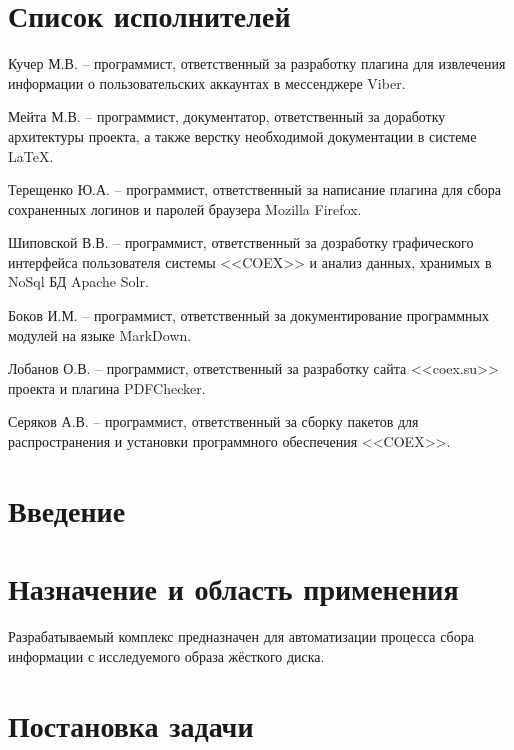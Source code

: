 


 
 
 
 \newpage
 \section*{Список исполнителей}
 
Кучер М.В. -- программист, ответственный за разработку плагина для извлечения информации о пользовательских аккаунтах в мессенджере Viber.

Мейта М.В. -- программист, документатор, ответственный за доработку архитектуры проекта, а также верстку необходимой документации в системе \LaTeX.

Терещенко Ю.А. -- программист, ответственный за написание плагина для сбора сохраненных логинов и паролей браузера Mozilla Firefox.

Шиповской В.В. -- программист, ответственный за дозработку графического интерфейса пользователя системы <<COEX>> и анализ данных, хранимых в NoSql БД Apache Solr.

Боков И.М. -- программист, ответственный за документирование программных модулей на языке MarkDown.

Лобанов О.В. -- программист, ответственный за разработку сайта <<coex.su>> проекта и плагина PDFChecker. 

Серяков А.В. -- программист, ответственный за сборку пакетов для распространения и установки программного обеспечения <<COEX>>.



 \newpage
 \tableofcontents

 \newpage
 \section*{Введение}
 

 \section{Назначение и область применения}
Разрабатываемый комплекс предназначен для автоматизации процесса сбора информации с исследуемого образа жёсткого диска.

\section{Постановка задачи}
\setcounter{figure}{0}


